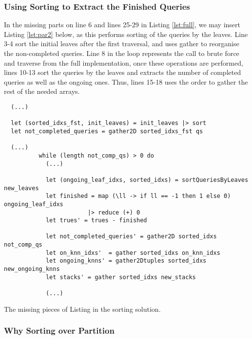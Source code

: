 



\subsubsection{Using Sorting to Extract the Finished Queries}
\label{sec:sord}

In the missing parts on line 6 and lines 25-29 in Listing \ref{lst:full}, we may insert Listing \ref{lst:par2} below, as this performs sorting of the queries by the leaves. 
Line 3-4 sort the initial leaves after the first traversal, and uses gather to reorganise the non-completed queries. Line 8 in the loop represents the call to brute force and traverse from the full implementation, once these operations are performed, lines 10-13 sort the queries by the leaves and extracts the number of completed queries as well as the ongoing ones. Thus, lines 15-18 uses the order to gather the rest of the needed arrays. 

\begin{listing}[H]
\begin{verbatim}
  (...)

  let (sorted_idxs_fst, init_leaves) = init_leaves |> sort
  let not_completed_queries = gather2D sorted_idxs_fst qs

  (...)
          while (length not_comp_qs) > 0 do
            (...)

            let (ongoing_leaf_idxs, sorted_idxs) = sortQueriesByLeaves new_leaves
            let finished = map (\ll -> if ll == -1 then 1 else 0) ongoing_leaf_idxs 
                        |> reduce (+) 0
            let trues' = trues - finished

            let not_completed_queries' = gather2D sorted_idxs not_comp_qs
            let on_knn_idxs'  = gather sorted_idxs on_knn_idxs
            let ongoing_knns' = gather2Dtuples sorted_idxs new_ongoing_knns
            let stacks' = gather sorted_idxs new_stacks

            (...)
\end{verbatim}
\caption{The missing pieces of Listing \protect{\ref{lst:full}} in the sorting solution.}
\label{lst:sor1}
\end{listing}


\subsubsection{Why Sorting over Partition}

